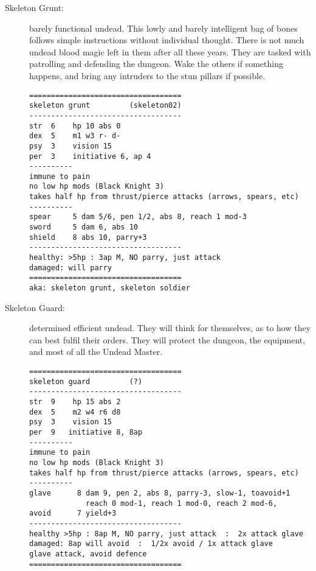 \begin{description}

\item[Skeleton Grunt:] barely functional undead. This lowly and barely intelligent bag of bones follows simple instructions without individual thought. There is not much undead blood magic left in them after all these years. They are tasked with patrolling and defending the dungeon. Wake the others if something happens, and bring any intruders to the stun pillars if possible.
\goodbreak \begin{samepage} \small \begin{verbatim}
===================================
skeleton grunt         (skeleton02)
-----------------------------------
str  6    hp 10 abs 0
dex  5    m1 w3 r- d-
psy  3    vision 15
per  3    initiative 6, ap 4
----------
immune to pain
no low hp mods (Black Knight 3)
takes half hp from thrust/pierce attacks (arrows, spears, etc)
----------
spear     5 dam 5/6, pen 1/2, abs 8, reach 1 mod-3
sword     5 dam 6, abs 10
shield    8 abs 10, parry+3
-----------------------------------
healthy: >5hp : 3ap M, NO parry, just attack
damaged: will parry
===================================
aka: skeleton grunt, skeleton soldier
\end{verbatim} \normalsize \end{samepage}


\item[Skeleton Guard:] determined efficient undead. They will think for themselves, as to how they can best fulfil their orders. They will protect the dungeon, the equipment, and most of all the Undead Master.
\goodbreak \begin{samepage} \small \begin{verbatim}
===================================
skeleton guard         (?)
-----------------------------------
str  9    hp 15 abs 2
dex  5    m2 w4 r6 d8
psy  3    vision 15
per  9   initiative 8, 8ap
----------
immune to pain
no low hp mods (Black Knight 3)
takes half hp from thrust/pierce attacks (arrows, spears, etc)
----------
glave      8 dam 9, pen 2, abs 8, parry-3, slow-1, toavoid+1
             reach 0 mod-1, reach 1 mod-0, reach 2 mod-6,
avoid      7 yield+3
-----------------------------------
healthy >5hp : 8ap M, NO parry, just attack  :  2x attack glave
damaged: 8ap will avoid  :  1/2x avoid / 1x attack glave
glave attack, avoid defence
===================================
\end{verbatim} \normalsize \end{samepage}



\end{description}
